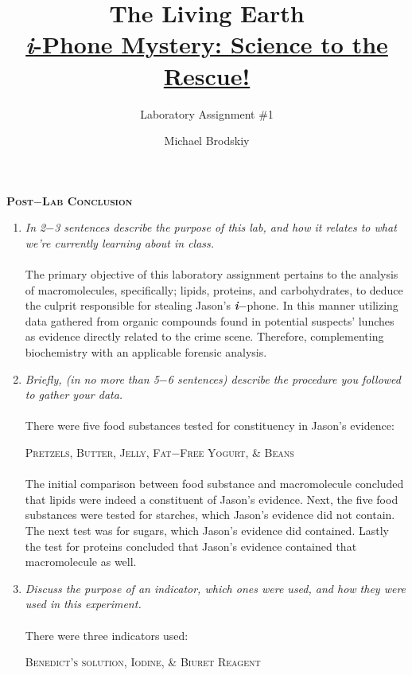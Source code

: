 \documentclass[12pt]{article}
\title{The Living Earth\\\underline{\textbf{\textit{i}}-Phone Mystery: Science to the Rescue!}}
\subtitle{Laboratory Assignment \#1}
\author{Michael Brodskiy}
\begin{document}
\maketitle
\begin{center} \textbf{\textsc{Post$-$Lab Conclusion}} \end{center} 
\newpage
\begin{enumerate}
    \item \textit{In 2$-$3 sentences describe the purpose of this lab, and how it relates to what we're currently learning about in class.}
    \paragraph{} The primary objective of this laboratory assignment pertains to the analysis of macromolecules, specifically; lipids, proteins, and carbohydrates, to deduce the culprit responsible for stealing Jason's \textbf{\textit{i}$-$}phone.
        In this manner utilizing data gathered from organic compounds found in potential suspects' lunches as evidence directly related to the crime scene. Therefore, complementing biochemistry with an applicable forensic analysis. 
    \item \textit{Briefly, (in no more than 5$-$6 sentences) describe the procedure you followed to gather your data.}
    \paragraph{} There were five food substances tested for constituency in Jason's evidence: \begin{center} \textsc{Pretzels}, \textsc{Butter}, \textsc{Jelly}, \textsc{Fat$-$Free Yogurt}, \& \textsc{Beans} \end{center} 
    \paragraph{} The initial comparison between food substance and macromolecule concluded that lipids were indeed a constituent of Jason's evidence. Next, the five food substances were tested for starches, which Jason's evidence did not contain. The next test was for sugars, which Jason's evidence did contained. Lastly the test for proteins concluded that Jason's evidence contained that macromolecule as well.
    \item \textit{Discuss the purpose of an indicator, which ones were used, and how they were used in this experiment.}
    \paragraph{} There were three indicators used:
    \begin{center} \textsc{Benedict's solution}, \textsc{Iodine}, \& \textsc{Biuret Reagent} \end{center}

\end{enumerate}
\end{document}
